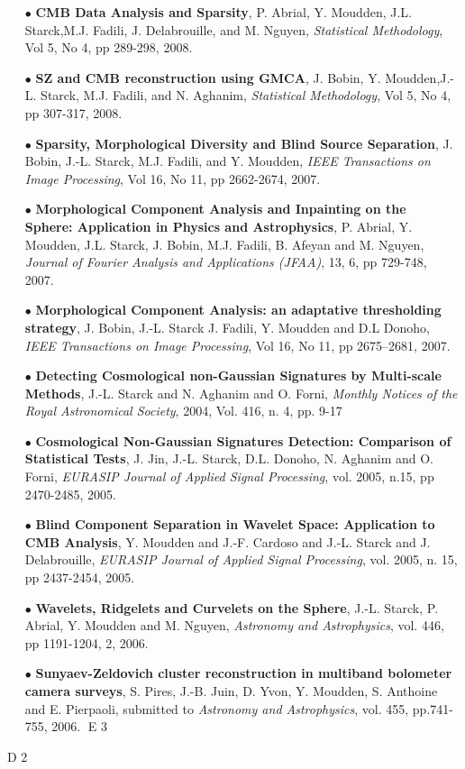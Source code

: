 \begin{itemize}
\item[$\bullet$] {\textbf{CMB Data Analysis and Sparsity}, P. Abrial, Y. Moudden, J.L. Starck,M.J. Fadili, J. Delabrouille, and M. Nguyen, \textit{Statistical Methodology}, Vol 5, No 4, pp 289-298, 2008.}
\item[$\bullet$] {\textbf{SZ and CMB reconstruction using GMCA}, J. Bobin, Y. Moudden,J.-L. Starck, M.J. Fadili, and N. Aghanim, \textit{Statistical Methodology}, Vol 5, No 4, pp 307-317, 2008.}
\item[$\bullet$] {\textbf{Sparsity, Morphological Diversity and Blind Source Separation}, J. Bobin, J.-L. Starck, M.J. Fadili, and Y. Moudden, \textit{IEEE Transactions on Image Processing}, Vol 16, No 11, pp 2662-2674, 2007.}
\item[$\bullet$] {\textbf{Morphological Component Analysis and Inpainting on the Sphere: Application in Physics and Astrophysics}, P. Abrial, Y. Moudden, J.L. Starck, J. Bobin, M.J. Fadili, B. Afeyan and M. Nguyen,  \textit{Journal of Fourier Analysis and Applications (JFAA)}, 13, 6, pp 729-748, 2007.}
\item[$\bullet$] {\textbf{Morphological Component Analysis: an adaptative thresholding strategy}, J. Bobin, J.-L. Starck J. Fadili, Y. Moudden and D.L Donoho, \textit{IEEE Transactions on Image Processing}, Vol 16, No 11, pp 2675--2681, 2007.}
\item[$\bullet$] {\textbf{Detecting Cosmological non-Gaussian Signatures by Multi-scale Methods}, J.-L. Starck and N. Aghanim and O. Forni, \textit{Monthly Notices of the Royal Astronomical Society}, 2004, Vol. 416, n. 4, pp. 9-17}
\item[$\bullet$] {\textbf{Cosmological Non-Gaussian Signatures Detection: Comparison of Statistical Tests}, J. Jin, J.-L. Starck, D.L. Donoho, N. Aghanim and O. Forni, \textit{EURASIP Journal of Applied Signal Processing}, vol. 2005, n.15, pp 2470-2485, 2005.}
\item[$\bullet$] {\textbf{Blind Component Separation in Wavelet Space: Application to {CMB} Analysis}, Y. Moudden and J.-F. Cardoso and J.-L. Starck and J. Delabrouille, \textit{EURASIP Journal of Applied Signal Processing}, vol. 2005, n. 15, pp 2437-2454, 2005.}
\item[$\bullet$] {\textbf{Wavelets, Ridgelets and Curvelets on the Sphere}, J.-L. Starck, P. Abrial, Y. Moudden and M. Nguyen, \textit{Astronomy and Astrophysics}, vol. 446, pp 1191-1204, 2, 2006.}
\item[$\bullet$] {\textbf{Sunyaev-Zeldovich cluster reconstruction in multiband bolometer camera surveys}, S. Pires, J.-B. Juin, D. Yvon, Y. Moudden, S. Anthoine and E. Pierpaoli, submitted to \textit{Astronomy and Astrophysics}, vol. 455,  pp.741-755, 2006.}
E 3
\end{itemize}
D 2

